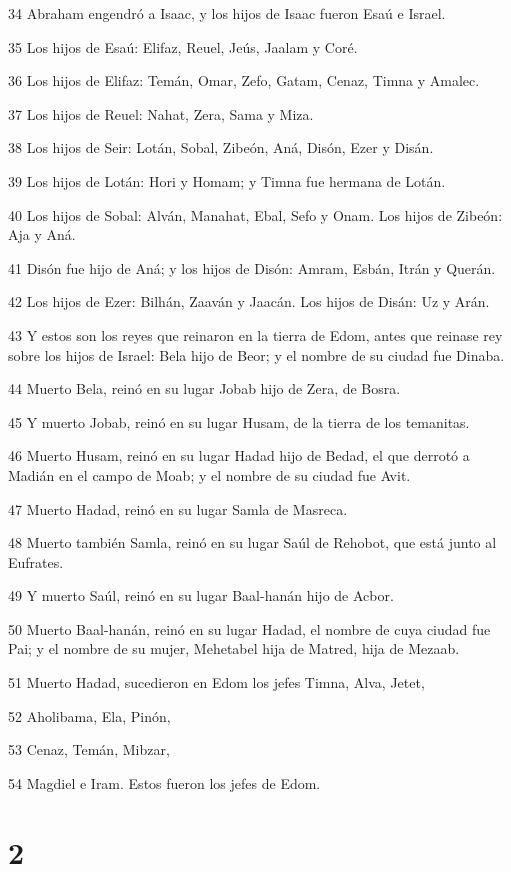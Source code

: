 \par 34 Abraham engendró a Isaac, y los hijos de Isaac fueron Esaú e Israel.
\par 35 Los hijos de Esaú: Elifaz, Reuel, Jeús, Jaalam y Coré.
\par 36 Los hijos de Elifaz: Temán, Omar, Zefo, Gatam, Cenaz, Timna y Amalec.
\par 37 Los hijos de Reuel: Nahat, Zera, Sama y Miza.
\par 38 Los hijos de Seir: Lotán, Sobal, Zibeón, Aná, Disón, Ezer y Disán.
\par 39 Los hijos de Lotán: Hori y Homam; y Timna fue hermana de Lotán.
\par 40 Los hijos de Sobal: Alván, Manahat, Ebal, Sefo y Onam. Los hijos de Zibeón: Aja y Aná.
\par 41 Disón fue hijo de Aná; y los hijos de Disón: Amram, Esbán, Itrán y Querán.
\par 42 Los hijos de Ezer: Bilhán, Zaaván y Jaacán. Los hijos de Disán: Uz y Arán.
\par 43 Y estos son los reyes que reinaron en la tierra de Edom, antes que reinase rey sobre los hijos de Israel: Bela hijo de Beor; y el nombre de su ciudad fue Dinaba.
\par 44 Muerto Bela, reinó en su lugar Jobab hijo de Zera, de Bosra.
\par 45 Y muerto Jobab, reinó en su lugar Husam, de la tierra de los temanitas.
\par 46 Muerto Husam, reinó en su lugar Hadad hijo de Bedad, el que derrotó a Madián en el campo de Moab; y el nombre de su ciudad fue Avit.
\par 47 Muerto Hadad, reinó en su lugar Samla de Masreca.
\par 48 Muerto también Samla, reinó en su lugar Saúl de Rehobot, que está junto al Eufrates.
\par 49 Y muerto Saúl, reinó en su lugar Baal-hanán hijo de Acbor.
\par 50 Muerto Baal-hanán, reinó en su lugar Hadad, el nombre de cuya ciudad fue Pai; y el nombre de su mujer, Mehetabel hija de Matred, hija de Mezaab.
\par 51 Muerto Hadad, sucedieron en Edom los jefes Timna, Alva, Jetet,
\par 52 Aholibama, Ela, Pinón,
\par 53 Cenaz, Temán, Mibzar,
\par 54 Magdiel e Iram. Estos fueron los jefes de Edom.

\chapter{2}

